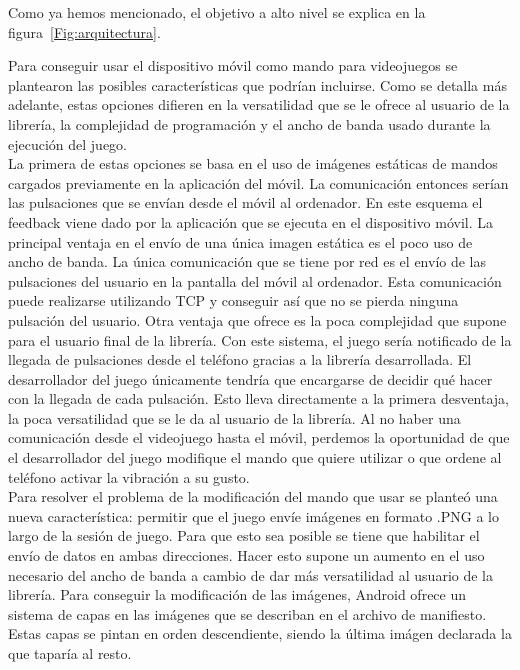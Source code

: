 Como ya hemos mencionado, el objetivo a alto nivel se explica en la figura~\ref{Fig:arquitectura}. 

Para conseguir usar el dispositivo m\'ovil como mando para videojuegos se plantearon las posibles caracter\'isticas que podr\'ian incluirse. Como se detalla m\'as adelante, estas opciones difieren en la versatilidad que se le ofrece al usuario de la librer\'ia, la complejidad de programaci\'on y el ancho de banda usado durante la ejecuci\'on del juego. \\

La primera de estas opciones se basa en el uso de im\'agenes est\'aticas de mandos cargados previamente en la aplicaci\'on del m\'ovil. La comunicaci\'on entonces ser\'ian las pulsaciones que se env\'ian desde el m\'ovil al ordenador.  En este esquema el feedback viene dado por la aplicaci\'on que se ejecuta en el dispositivo m\'ovil. La principal ventaja en el env\'io de una \'unica imagen est\'atica es el poco uso de ancho de banda. La \'unica comunicaci\'on que se tiene por red es el env\'io de las pulsaciones del usuario en la pantalla del m\'ovil al ordenador. Esta comunicaci\'on puede realizarse utilizando TCP y conseguir as\'i que no se pierda ninguna pulsaci\'on del usuario. Otra ventaja que ofrece es la poca complejidad que supone para el usuario final de la librer\'ia. Con este sistema, el juego ser\'ia notificado de la llegada de pulsaciones desde el tel\'efono gracias a la librer\'ia desarrollada. El desarrollador del juego \'unicamente tendr\'ia que encargarse de decidir qu\'e hacer con la llegada de cada pulsaci\'on. Esto lleva directamente a la primera desventaja, la poca versatilidad que se le da al usuario de la librer\'ia. Al no haber una comunicaci\'on desde el videojuego hasta el m\'ovil, perdemos la oportunidad de que el desarrollador del juego modifique el mando que quiere utilizar o que ordene al tel\'efono activar la vibraci\'on a su gusto.\\

Para resolver el problema de la modificaci\'on del mando que usar se plante\'o una nueva caracter\'istica: permitir que el juego env\'ie im\'agenes en formato .PNG a lo largo de la sesi\'on de juego. Para que esto sea posible se tiene que habilitar el env\'io de datos en ambas direcciones. Hacer esto supone un aumento en el uso necesario del ancho de banda a cambio de dar m\'as versatilidad al usuario de la librer\'ia. Para conseguir la modificaci\'on de las im\'agenes, Android ofrece un sistema de capas en las im\'agenes que se describan en el archivo de manifiesto. Estas capas se pintan en orden descendiente, siendo la \'ultima im\'agen declarada la que tapar\'ia al resto. \\


